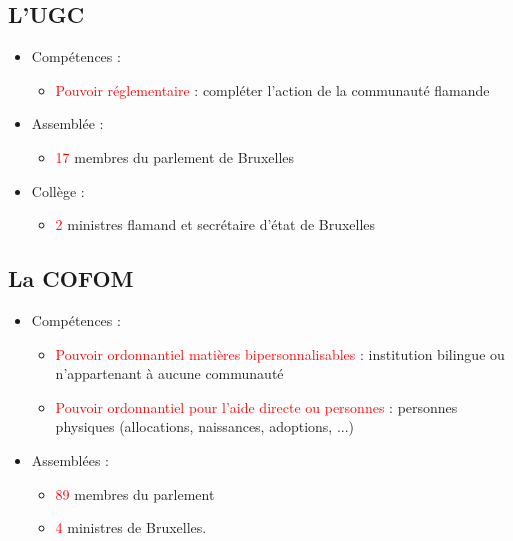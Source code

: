 \subsection{L'UGC}
\begin{itemize}
	\item Compétences :
	\begin{itemize}
		\item \textcolor{red}{Pouvoir réglementaire} : compléter l'action de la communauté flamande
	\end{itemize}
	\item Assemblée :
	\begin{itemize}
		\item \textcolor{red}{17} membres du parlement de Bruxelles
	\end{itemize}
	\item Collège :
	\begin{itemize}
		\item \textcolor{red}{2} ministres flamand et secrétaire d'état de Bruxelles
	\end{itemize}
\end{itemize}

\subsection{La COFOM}
\begin{itemize}
	\item Compétences :
	\begin{itemize}
		\item \textcolor{red}{Pouvoir ordonnantiel matières bipersonnalisables} : institution bilingue ou n'appartenant à aucune communauté
		\item \textcolor{red}{Pouvoir ordonnantiel pour l'aide directe ou personnes} : personnes physiques (allocations, naissances, adoptions, ...) 
	\end{itemize}
	\item Assemblées :
	\begin{itemize}
		\item \textcolor{red}{89} membres du parlement
		\item \textcolor{red}{4} ministres de Bruxelles.
	\end{itemize}
\end{itemize}